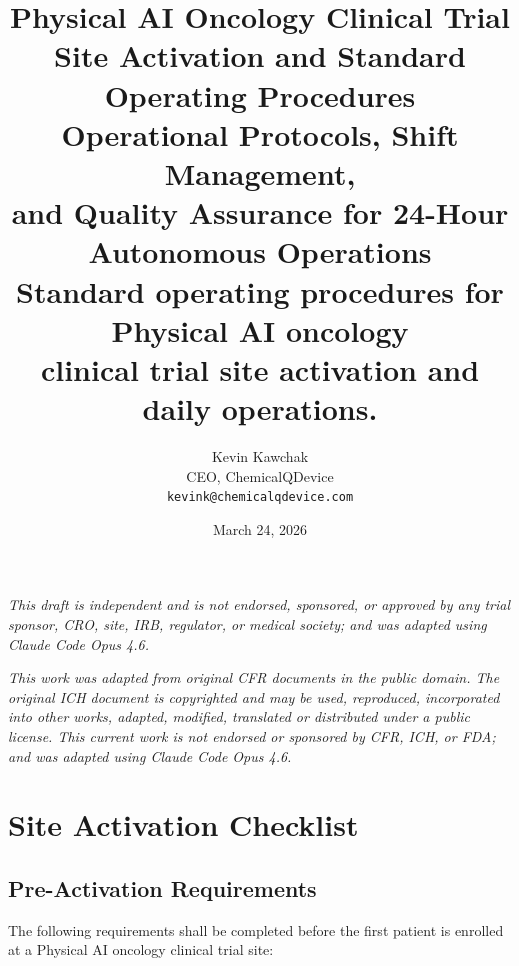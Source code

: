 \documentclass[11pt,letterpaper]{article}
\title{%
  \textbf{Physical AI Oncology Clinical Trial}\\
  \textbf{Site Activation and Standard Operating Procedures}\\[6pt]
  \large Operational Protocols, Shift Management,\\
  and Quality Assurance for 24-Hour Autonomous Operations\\[6pt]
  \normalsize Standard operating procedures for Physical AI oncology\\
  clinical trial site activation and daily operations.
}
\author{%
  Kevin Kawchak\\
  CEO, ChemicalQDevice\\
  \texttt{kevink@chemicalqdevice.com}
}
\date{March 24, 2026}
\begin{document}
\maketitle
\thispagestyle{fancy}

\begin{center}
\footnotesize
\textit{This draft is independent and is not endorsed, sponsored, or approved
by any trial sponsor, CRO, site, IRB, regulator, or medical society;
and was adapted using Claude Code Opus 4.6.}
\end{center}

\vspace{0.5em}

\begin{center}
\footnotesize
\textit{This work was adapted from original CFR documents in the public domain.
The original ICH document is copyrighted and may be used, reproduced,
incorporated into other works, adapted, modified, translated or distributed
under a public license. This current work is not endorsed or sponsored by
CFR, ICH, or FDA; and was adapted using Claude Code Opus 4.6.}
\end{center}

\vspace{1em}
\tableofcontents
\newpage

\section{Site Activation Checklist}

\subsection{Pre-Activation Requirements}

The following requirements shall be completed before the first patient is
enrolled at a Physical AI oncology clinical trial site:
\end{document}
